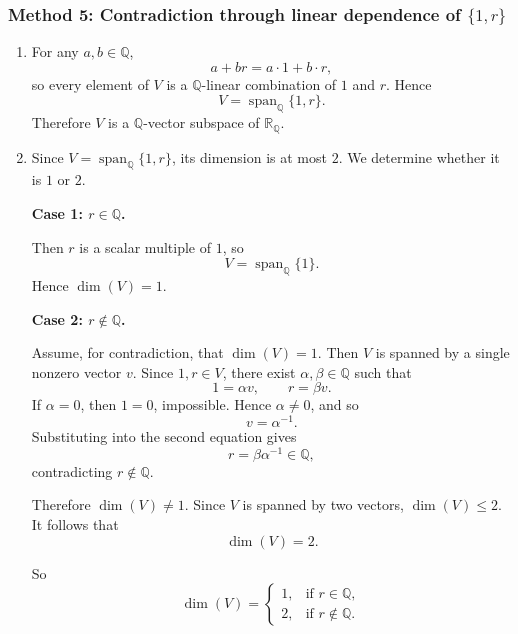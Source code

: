 \documentclass[12pt]{article}
\newcommand{\Q}{\mathbb{Q}}
\newcommand{\R}{\mathbb{R}}
\newcommand{\dimn}{\operatorname{dim}}
\begin{document}
\subsubsection{Method 5: Contradiction through linear dependence of \(\{1,r\}\)}
\begin{enumerate}[label=(\alph*)]
\item For any \(a,b\in\Q\),
\[
a+br=a\cdot 1+b\cdot r,
\]
so every element of \(V\) is a \(\Q\)-linear combination of \(1\) and \(r\). Hence
\[
V=\operatorname{span}_{\Q}\{1,r\}.
\]
Therefore \(V\) is a \(\Q\)-vector subspace of \(\R_{\Q}\).

\item Since \(V=\operatorname{span}_{\Q}\{1,r\}\), its dimension is at most \(2\). We determine whether it is \(1\) or \(2\).

\textbf{Case 1: \(r\in\Q\).}

Then \(r\) is a scalar multiple of \(1\), so
\[
V=\operatorname{span}_{\Q}\{1\}.
\]
Hence \(\dimn(V)=1\).

\textbf{Case 2: \(r\notin\Q\).}

Assume, for contradiction, that \(\dimn(V)=1\). Then \(V\) is spanned by a single nonzero vector \(v\). Since \(1,r\in V\), there exist \(\alpha,\beta\in\Q\) such that
\[
1=\alpha v,
\qquad
r=\beta v.
\]
If \(\alpha=0\), then \(1=0\), impossible. Hence \(\alpha\neq 0\), and so
\[
v=\alpha^{-1}.
\]
Substituting into the second equation gives
\[
r=\beta \alpha^{-1}\in\Q,
\]
contradicting \(r\notin\Q\).

Therefore \(\dimn(V)\neq 1\). Since \(V\) is spanned by two vectors, \(\dimn(V)\le 2\). It follows that
\[
\dimn(V)=2.
\]

So
\[
\boxed{
\dimn(V)=
\begin{cases}
1, & \text{if } r\in\Q,\\[1mm]
2, & \text{if } r\notin\Q.
\end{cases}}
\]
\end{enumerate}
\end{document}
